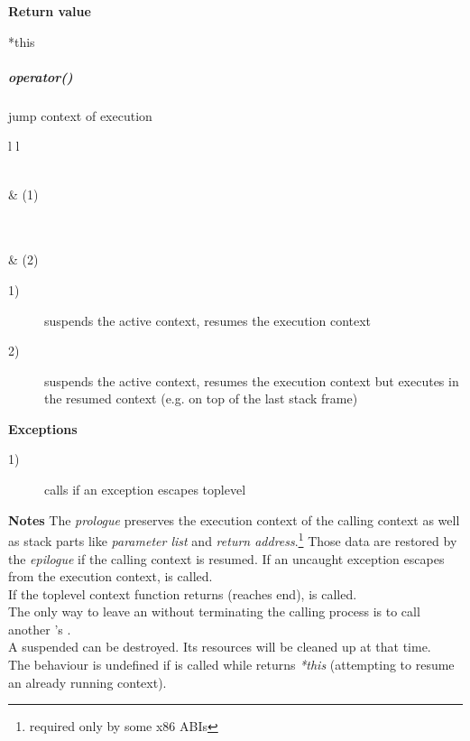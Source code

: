 {\bfseries Return value}
\begin{description}
    \item[*this]
\end{description}

\subparagraph*{operator()}
jump context of execution\\

\begin{tabular}{ l l }
    \midrule

    \\
     & (1)\\

    \midrule

    \\
    \\
     & (2)\\

    \midrule
\end{tabular}

\begin{description}
    \item[1)] suspends the active context, resumes the execution context
    \item[2)] suspends the active context, resumes the execution context but
        executes  in the resumed context (e.g. on top of the
        last stack frame)
\end{description}

{\bfseries Exceptions}
\begin{description}
    \item[1)] calls  if an exception escapes toplevel \\
\end{description}

{\bfseries Notes}
\newline
The \emph{prologue} preserves the execution context of the calling context as well
as stack parts like \emph{parameter list} and \emph{return
address}.\footnote{required only by some x86 ABIs} Those data are restored by the
\emph{epilogue} if the calling context is resumed.
\newline
If an uncaught exception escapes from the execution context,
 is called.\\
If the toplevel context function returns (reaches end), 
is called.\\
The only way to leave an  without terminating the
calling process is to call
another 's .\\
A suspended  can be destroyed. Its resources will be
cleaned up at that time.\\
The behaviour is undefined if  is called while 
returns \emph{*this} (attempting to resume an already running context).

